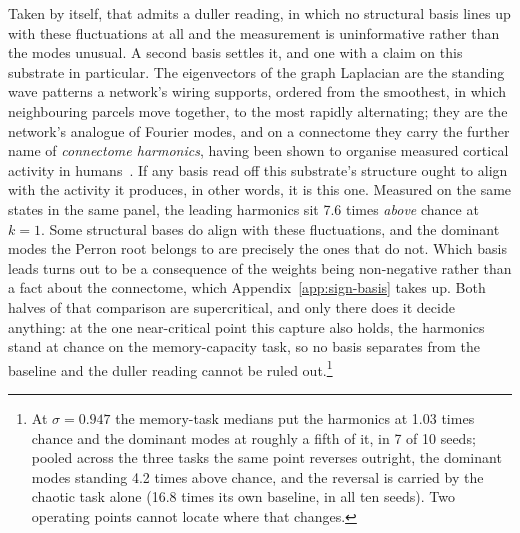 Taken by itself, that admits a duller reading, in which no structural basis
lines up with these fluctuations at all and the measurement is uninformative
rather than the modes unusual. A second basis settles it, and one with a claim
on this substrate in particular. The eigenvectors of the graph Laplacian are the
standing wave patterns a network's wiring supports, ordered from the smoothest,
in which neighbouring parcels move together, to the most rapidly alternating;
they are the network's analogue of Fourier modes, and on a connectome they carry
the further name of \emph{connectome harmonics}, having been shown to organise measured
cortical activity in humans~\cite{atasoy2016human}. If any basis read off this
substrate's structure ought to align with the activity it produces, in other
words, it is this one. Measured on the same states in the same panel,
the leading harmonics sit
7.6 times %
\emph{above} chance at $k = 1$. Some structural bases do align with these
fluctuations, and the dominant modes the Perron root belongs to are precisely
the ones that do not. Which basis leads turns out to be a consequence of the
weights being non-negative rather than a fact about the connectome, which
Appendix~\ref{app:sign-basis} takes up. Both halves of that comparison are
supercritical, and only there does it decide anything: at the one near-critical
point this capture also holds, the harmonics stand at chance on the
memory-capacity task, so no basis separates from the baseline and the duller
reading cannot be ruled out.\footnote{At
$\sigma = 0.947$ %
the memory-task medians put the harmonics at
1.03 times chance %
and the dominant modes at roughly a fifth of it, in
7 of 10 seeds; %
pooled across the three tasks the same point reverses outright, the dominant
modes standing 4.2 times %
above chance, and the reversal is carried by the chaotic task alone
(16.8 times %
its own baseline, in all ten seeds). Two operating points cannot locate where
that changes.}

